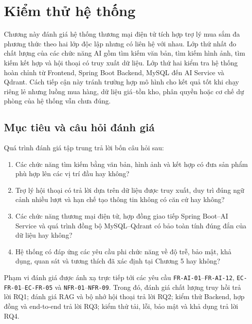 
\section{Kiểm thử hệ thống}

Chương này đánh giá hệ thống thương mại điện tử tích hợp trợ lý mua sắm đa phương thức theo hai lớp độc lập nhưng có liên hệ với nhau. Lớp thứ nhất đo chất lượng của các chức năng AI gồm tìm kiếm văn bản, tìm kiếm hình ảnh, tìm kiếm kết hợp và hội thoại có truy xuất dữ liệu. Lớp thứ hai kiểm tra hệ thống hoàn chỉnh từ Frontend, Spring Boot Backend, MySQL đến AI Service và Qdrant. Cách tiếp cận này tránh trường hợp mô hình cho kết quả tốt khi chạy riêng lẻ nhưng luồng mua hàng, dữ liệu giá--tồn kho, phân quyền hoặc cơ chế dự phòng của hệ thống vẫn chưa đúng.

\subsection{Mục tiêu và câu hỏi đánh giá}

Quá trình đánh giá tập trung trả lời bốn câu hỏi sau:

\begin{enumerate}[label=\textbf{RQ\arabic*:},leftmargin=1.8cm]
    \item Các chức năng tìm kiếm bằng văn bản, hình ảnh và kết hợp có đưa sản phẩm phù hợp lên các vị trí đầu hay không?
    \item Trợ lý hội thoại có trả lời dựa trên dữ liệu được truy xuất, duy trì đúng ngữ cảnh nhiều lượt và hạn chế tạo thông tin không có căn cứ hay không?
    \item Các chức năng thương mại điện tử, hợp đồng giao tiếp Spring Boot--AI Service và quá trình đồng bộ MySQL--Qdrant có bảo toàn tính đúng đắn của dữ liệu hay không?
    \item Hệ thống có đáp ứng các yêu cầu phi chức năng về độ trễ, bảo mật, khả dụng, quan sát và tương thích đã xác định tại Chương 5 hay không?
\end{enumerate}

Phạm vi đánh giá được ánh xạ trực tiếp tới các yêu cầu \texttt{FR-AI-01}--\texttt{FR-AI-12}, \texttt{EC-FR-01}--\texttt{EC-FR-05} và \texttt{NFR-01}--\texttt{NFR-09}. Trong đó, đánh giá chất lượng truy hồi trả lời RQ1; đánh giá RAG và bộ nhớ hội thoại trả lời RQ2; kiểm thử Backend, hợp đồng và end-to-end trả lời RQ3; kiểm thử tải, lỗi, bảo mật và khả dụng trả lời RQ4.

